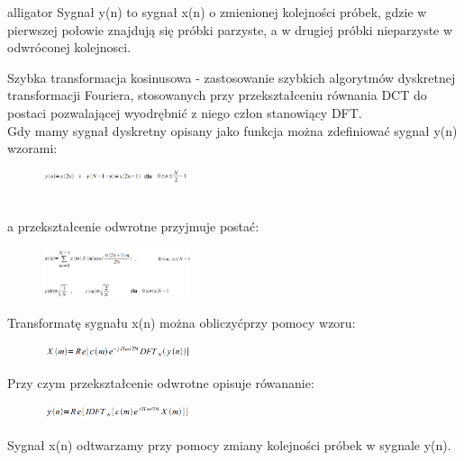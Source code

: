 \documentclass[12pt]{article}
\begin{document}
\begin{labeling}{alligator}
Sygnał y(n) to sygnał x(n) o zmienionej kolejności próbek, gdzie w pierwszej połowie znajdują się próbki parzyste, a w drugiej próbki nieparzyste w odwróconej kolejnosci.




\item [Szybka transformacja kosinusowa] - zastosowanie szybkich algorytmów dyskretnej transformacji Fouriera, stosowanych przy przekształceniu
równania DCT do postaci pozwalającej wyodrębnić z niego człon stanowiący DFT. 
\\ Gdy mamy sygnał dyskretny opisany jako funkcja można zdefiniować
sygnał y(n) wzorami:
\begin{figure}[h!]
 \centering
 \includegraphics[width=4.3cm]{yn.PNG}
 \vspace{-0.3cm}
 \label{kr}
\end{figure}
\\ a przekształcenie odwrotne przyjmuje postać: 
\begin{figure}[h!]
 \centering
 \includegraphics[width=4.3cm]{DCT2O.PNG}
 \vspace{-0.3cm}
 \label{kw}
\end{figure}

Transformatę sygnału x(n) można obliczyćprzy pomocy wzoru:
\begin{figure}[h!]
 \centering
 \includegraphics[width=4.3cm]{xmF.PNG}
 \vspace{-0.3cm}
 \label{kw}
\end{figure}
Przy czym przekształcenie odwrotne opisuje rówananie:
\begin{figure}[h!]
 \centering
 \includegraphics[width=4.3cm]{xmFO.PNG}
 \vspace{-0.3cm}
 \label{kw}
\end{figure}

Sygnał x(n) odtwarzamy przy pomocy zmiany kolejności próbek w sygnale y(n).

\end{labeling}
\end{document}
